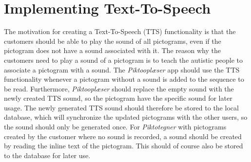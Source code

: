 \section{Implementing Text-To-Speech}
The motivation for creating a Text-To-Speech (TTS) functionality is that the customers should be able to play the sound of all pictograms, even if the pictogram does not have a sound associated with it.
The reason why the customers need to play a sound of a pictogram is to teach the autistic people to associate a pictogram with a sound.
The \textit{Piktooplæser} app should use the TTS functionality whenever a pictogram without a sound is added to the sequence to be read.
Furthermore, \textit{Piktooplæser} should replace the empty sound with the newly created TTS sound, so the pictogram have the specific sound for later usage. The newly generated TTS sound should therefore be stored to the local database, which will synchronize the updated pictograms with the other users, so the sound should only be generated once.
For \textit{Piktotegner} with pictograms created by the customer where no sound is recorded, a sound should be created by reading the inline text of the pictogram. This should of course also be stored to the database for later use.